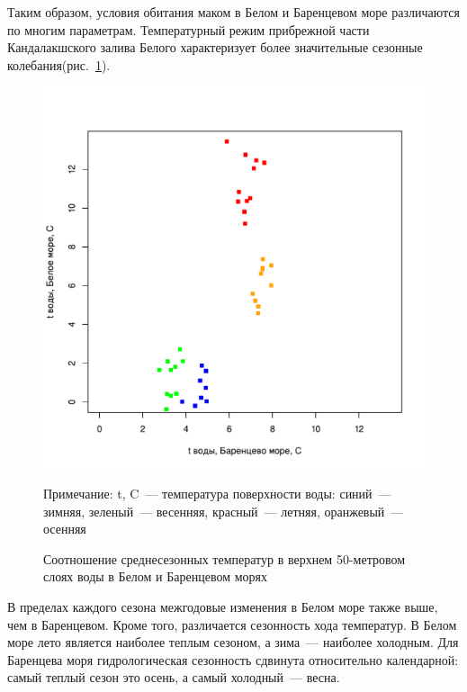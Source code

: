 \bigskip

Таким образом, условия обитания маком в Белом и Баренцевом море различаются по многим параметрам.
Температурный режим прибрежной части Кандалакшского залива Белого характеризует более значительные сезонные колебания(рис.~\ref{ris:temp_White_Barents}).
	\begin{figure}[p]
    \includegraphics[width=\textwidth]{../temperatures_water_air/temp_White_Barents1.pdf}
    \caption{Соотношение среднесезонных температур в верхнем 50-метровом слоях воды в Белом и Баренцевом морях}

{\footnotesize Примечание: t, C~--- температура поверхности воды: синий~--- зимняя, зеленый~--- весенняя, красный~--- летняя, оранжевый~--- осенняя}
    \label{ris:temp_White_Barents}
	\end{figure}
В пределах каждого сезона межгодовые изменения в Белом море также выше, чем в Баренцевом.
Кроме того, различается сезонность хода температур. 
В Белом море лето является наиболее теплым сезоном, а зима~--- наиболее холодным.
Для Баренцева моря гидрологическая сезонность сдвинута относительно календарной: самый теплый сезон это осень, а самый холодный~--- весна.

\afterpage{\clearpage}
